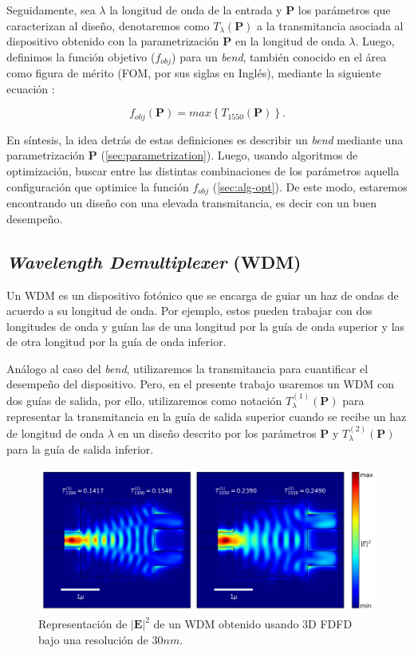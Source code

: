 Seguidamente, sea $\lambda$ la longitud de onda de la entrada y $\boldsymbol{P}$ los parámetros que caracterizan al
diseño, denotaremos como $T_{\lambda}(\boldsymbol{P})$ a la transmitancia asociada al dispositivo obtenido con la
parametrización $\boldsymbol{P}$ en la longitud de onda $\lambda$. Luego, definimos la función objetivo 
($f_{obj}$) para un \emph{bend}, también conocido en el área como figura de mérito (FOM, por sus siglas en
Inglés), 
mediante la siguiente ecuación \citep{Su2020}:

\begin{equation}
  f_{obj}(\boldsymbol{P}) = max \left \{ T_{1550} (\boldsymbol{P}) \right \}.
\label{eq:fom-bend}
\end{equation}

En síntesis, la idea detrás de estas definiciones es describir un \emph{bend} mediante una parametrización
$\boldsymbol{P}$
(\autoref{sec:parametrization}).
Luego, usando algoritmos de optimización, buscar entre las distintas combinaciones de los parámetros aquella configuración
que optimice la función $f_{obj}$ (\autoref{sec:alg-opt}).
De este modo, estaremos encontrando un diseño con una elevada transmitancia, es decir con un buen desempeño.

\subsection{\emph{Wavelength Demultiplexer} (WDM)}

Un WDM es un dispositivo fotónico que se encarga de guiar un haz de ondas de acuerdo a su longitud de onda.
Por ejemplo, estos pueden trabajar con dos longitudes de onda y guían las de una longitud por la guía de onda superior
y las de otra longitud por la guía de onda inferior.

Análogo al caso del \emph{bend}, utilizaremos la transmitancia para cuantificar el desempeño del dispositivo.
Pero, en el presente trabajo usaremos un WDM con dos guías de salida, por ello, utilizaremos como notación
$T_{\lambda}^{(1)}(\boldsymbol{P})$ para
representar la transmitancia en la guía de salida superior cuando se recibe un haz de longitud de onda
$\lambda$ en un diseño descrito por los parámetros $\boldsymbol{P}$ y $T_{\lambda}^{(2)}(\boldsymbol{P})$ para la guía de salida inferior.

\begin{figure}[ht]
  \centering
  \includegraphics[scale=0.7]{image/theory/wdm_field_dx30_px16_px16.png}
  \caption{Representación de $|\boldsymbol{E}|^2$ de un WDM obtenido usando 3D FDFD bajo una resolución de $30 nm$.}
  \label{fig:efield-wdm}
\end{figure}

